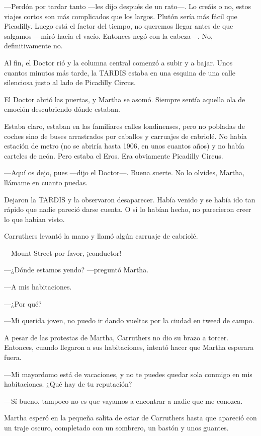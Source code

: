 ---Perdón por tardar tanto ---les dijo después de un rato---. Lo creáis
o no, estos viajes cortos son más complicados que los largos. Plutón
sería más fácil que Picadilly. Luego está el factor del tiempo, no
queremos llegar antes de que salgamos ---miró hacia el vacío. Entonces
negó con la cabeza---. No, definitivamente no.

Al fin, el Doctor rió y la columna central comenzó a subir y a bajar.
Unos cuantos minutos más tarde, la TARDIS estaba en una esquina de una
calle silenciosa justo al lado de Picadilly Circus.

El Doctor abrió las puertas, y Martha se asomó. Siempre sentía aquella
ola de emoción descubriendo dónde estaban.

Estaba claro, estaban en las familiares calles londinenses, pero no
pobladas de coches sino de buses arrastrados por caballos y carruajes de
cabriolé. No había estación de metro (no se abriría hasta 1906, en unos
cuantos años) y no había carteles de neón. Pero estaba el Eros. Era
obviamente Picadilly Circus.

---Aquí os dejo, pues ---dijo el Doctor---. Buena suerte. No lo olvides,
Martha, llámame en cuanto puedas.

Dejaron la TARDIS y la observaron desaparecer. Había venido y se había
ido tan rápido que nadie pareció darse cuenta. O si lo habían hecho, no
parecieron creer lo que habían visto.

Carruthers levantó la mano y llamó algún carruaje de cabriolé.

---Mount Street por favor, ¡conductor!

---¿Dónde estamos yendo? ---preguntó Martha.

---A mis habitaciones.

---¿Por qué?

---Mi querida joven, no puedo ir dando vueltas por la ciudad en tweed de
campo.

A pesar de las protestas de Martha, Carruthers no dio su brazo a torcer.
Entonces, cuando llegaron a sus habitaciones, intentó hacer que Martha
esperara fuera.

---Mi mayordomo está de vacaciones, y no te puedes quedar sola conmigo
en mis habitaciones. ¿Qué hay de tu reputación?

---Sí bueno, tampoco no es que vayamos a encontrar a nadie que me
conozca.

Martha esperó en la pequeña salita de estar de Carruthers hasta que
apareció con un traje oscuro, completado con un sombrero, un bastón y
unos guantes.

